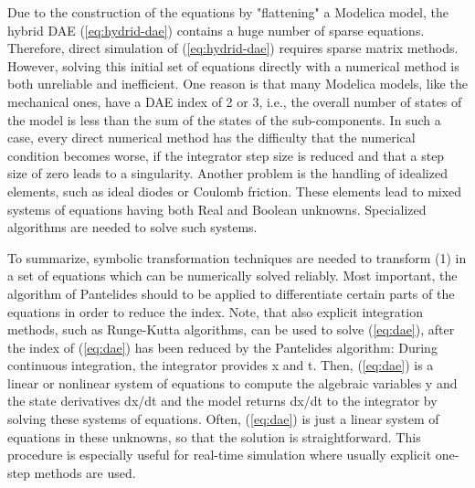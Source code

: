 Due to the construction of the equations by "flattening" a Modelica
model, the hybrid DAE (\ref{eq:hydrid-dae}) contains a huge number of sparse equations.
Therefore, direct simulation of (\ref{eq:hydrid-dae}) requires sparse matrix methods.
However, solving this initial set of equations directly with a numerical
method is both unreliable and inefficient. One reason is that many
Modelica models, like the mechanical ones, have a DAE index of 2 or 3,
i.e., the overall number of states of the model is less than the sum of
the states of the sub-components. In such a case, every direct numerical
method has the difficulty that the numerical condition becomes worse, if
the integrator step size is reduced and that a step size of zero leads
to a singularity. Another problem is the handling of idealized elements,
such as ideal diodes or Coulomb friction. These elements lead to mixed
systems of equations having both Real and Boolean unknowns. Specialized
algorithms are needed to solve such systems.

To summarize, symbolic transformation techniques are needed to transform
(1) in a set of equations which can be numerically solved reliably. Most
important, the algorithm of Pantelides should to be applied to
differentiate certain parts of the equations in order to reduce the
index. Note, that also explicit integration methods, such as Runge-Kutta
algorithms, can be used to solve (\ref{eq:dae}), after the index of (\ref{eq:dae}) has been
reduced by the Pantelides algorithm: During continuous integration, the
integrator provides x and t. Then, (\ref{eq:dae}) is a linear or nonlinear system
of equations to compute the algebraic variables y and the state
derivatives dx/dt and the model returns dx/dt to the integrator by
solving these systems of equations. Often, (\ref{eq:dae}) is just a linear system
of equations in these unknowns, so that the solution is straightforward.
This procedure is especially useful for real-time simulation where
usually explicit one-step methods are used.
